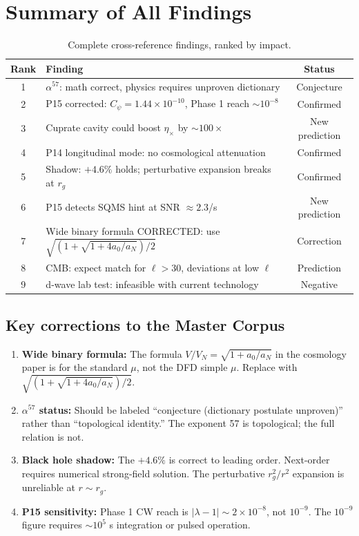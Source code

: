 \documentclass[11pt]{article}
\newcommand{\ee}[1]{\times 10^{#1}}
\begin{document}
\section*{Summary of All Findings}

\begin{table}[h]
\centering
\caption{Complete cross-reference findings, ranked by impact.}
\begin{tabular}{clc}
\toprule
Rank & Finding & Status \\
\midrule
1 & $\alpha^{57}$: math correct, physics requires unproven dictionary & Conjecture \\
2 & P15 corrected: $C_\psi = 1.44\ee{-10}$, Phase 1 reach $\sim 10^{-8}$ & Confirmed \\
3 & Cuprate cavity could boost $\eta_\times$ by $\sim 100\times$ & New prediction \\
4 & P14 longitudinal mode: no cosmological attenuation & Confirmed \\
5 & Shadow: $+4.6\%$ holds; perturbative expansion breaks at $r_g$ & Confirmed \\
6 & P15 detects SQMS hint at SNR $\approx 2.3$/s & New prediction \\
7 & Wide binary formula CORRECTED: use $\sqrt{(1+\sqrt{1+4a_0/a_N})/2}$ & Correction \\
8 & CMB: expect match for $\ell > 30$, deviations at low $\ell$ & Prediction \\
9 & d-wave lab test: infeasible with current technology & Negative \\
\bottomrule
\end{tabular}
\end{table}

\subsection*{Key corrections to the Master Corpus}

\begin{enumerate}
\item \textbf{Wide binary formula:} The formula $V/V_N = \sqrt{1+a_0/a_N}$ in the cosmology paper is for the standard $\mu$, not the DFD simple $\mu$. Replace with $\sqrt{(1+\sqrt{1+4a_0/a_N})/2}$.

\item \textbf{$\alpha^{57}$ status:} Should be labeled ``conjecture (dictionary postulate unproven)'' rather than ``topological identity.'' The exponent 57 is topological; the full relation is not.

\item \textbf{Black hole shadow:} The $+4.6\%$ is correct to leading order. Next-order requires numerical strong-field solution. The perturbative $r_g^2/r^2$ expansion is unreliable at $r \sim r_g$.

\item \textbf{P15 sensitivity:} Phase 1 CW reach is $|\lambda-1| \sim 2\ee{-8}$, not $10^{-9}$. The $10^{-9}$ figure requires $\sim 10^5$ s integration or pulsed operation.
\end{enumerate}
\end{document}
